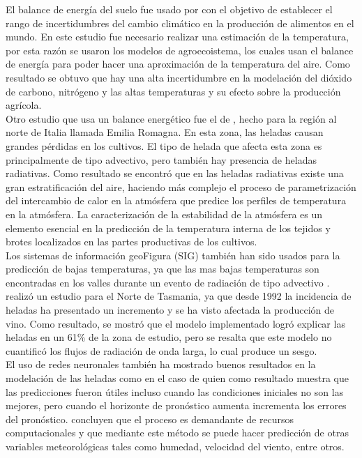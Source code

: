 El balance de energía del suelo fue usado por \citet{Rosenzweig2014} con el objetivo de establecer el rango de incertidumbres del cambio climático en la producción de alimentos en el mundo. En este estudio fue necesario realizar una estimación de la temperatura, por esta razón se usaron los modelos de agroecoistema, los cuales usan el balance de energía para poder hacer una aproximación de la temperatura del aire. Como resultado se obtuvo que hay una alta incertidumbre en la modelación del dióxido de carbono, nitrógeno y las altas temperaturas y su efecto sobre la producción agrícola.\\

Otro estudio que usa un balance energético fue el de \citet{Rossi2002}, hecho para la región al norte de Italia llamada Emilia Romagna. En esta zona, las heladas causan grandes pérdidas en los cultivos. El tipo de helada que afecta esta zona es principalmente de tipo advectivo, pero también hay presencia de heladas radiativas. Como resultado se encontró que en las heladas radiativas existe una gran estratificación del aire, haciendo más complejo el proceso de parametrización del intercambio de calor en la atmósfera que predice los perfiles de temperatura en la atmósfera. La caracterización de la estabilidad de la atmósfera es un elemento esencial en la predicción de la temperatura interna de los tejidos y brotes localizados en las partes productivas de los cultivos.\\

Los sistemas de información geoFigura (SIG) también han sido usados para la predicción de bajas temperaturas, ya que las mas bajas temperaturas son encontradas en los valles durante un evento de radiación de tipo advectivo \citep{Halley2003, Blennow1998}. \citet{Halley2003} realizó un estudio para el Norte de Tasmania, ya que desde 1992 la incidencia de heladas ha presentado un incremento y se ha visto afectada la producción de vino. Como resultado, se mostró que el modelo implementado logró explicar las heladas en un 61\% de la zona de estudio, pero se resalta que este modelo no cuantificó los flujos de radiación de onda larga, lo cual produce un sesgo.\\

El uso de redes neuronales también ha mostrado buenos resultados en la modelación de las heladas como en el caso de \citet{Smith2007} quien como resultado muestra que las predicciones fueron útiles incluso cuando las condiciones iniciales no son las mejores, pero cuando el horizonte de pronóstico aumenta incrementa los errores del pronóstico. \citet{Abhishek2012} concluyen que el proceso es demandante de recursos computacionales y que mediante este método se puede hacer predicción de otras variables meteorológicas tales como humedad, velocidad del viento, entre otros.\\

